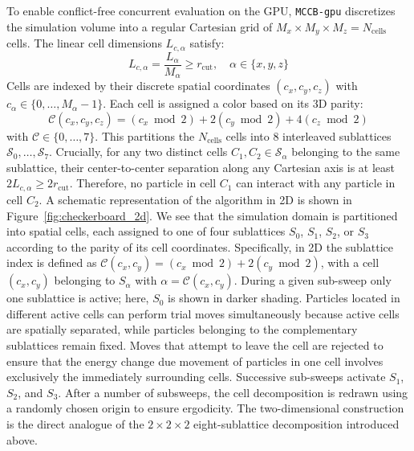 \documentclass[final,5p,times,twocolumn]{elsarticle}
\begin{document}
To enable conflict-free concurrent evaluation on the GPU, \texttt{MCCB-gpu} discretizes the simulation volume into a regular Cartesian grid of $M_x \times M_y \times M_z = N_{\text{cells}}$ cells. The linear cell dimensions $L_{c,\alpha}$ satisfy:
\begin{equation}
    L_{c,\alpha} = \frac{L_\alpha}{M_\alpha} \ge r_{\text{cut}}, \quad \alpha \in \{x, y, z\}
    \label{eq:cell_condition}
\end{equation}
Cells are indexed by their discrete spatial coordinates $(c_x, c_y, c_z)$ with $c_\alpha \in \{0, \dots, M_\alpha - 1\}$. Each cell is assigned a color based on its 3D parity:
\begin{equation}
    \mathcal{C}(c_x, c_y, c_z) = (c_x \bmod 2) + 2(c_y \bmod 2) + 4(c_z \bmod 2)
    \label{eq:parity}
\end{equation}
with $\mathcal{C} \in \{0, \dots, 7\}$. This partitions the
$N_{\text{cells}}$ cells into 8 interleaved sublattices
$\mathcal{S}_0, \dots, \mathcal{S}_7$. Crucially, for any two distinct
cells $C_1, C_2 \in \mathcal{S}_\alpha$ belonging to the same sublattice,
their center-to-center separation along any Cartesian axis is at least
$2 L_{c,\alpha} \ge 2 r_{\text{cut}}$. Therefore, no particle in cell
$C_1$ can interact with any particle in cell $C_2$. A schematic
representation of the algorithm in 2D is shown in Figure~\ref{fig:checkerboard_2d}.
We see that the simulation domain is partitioned into spatial cells, each assigned 
to one of four sublattices $S_0$, $S_1$, $S_2$, or $S_3$ according to
the parity of its cell coordinates. Specifically, in 2D the sublattice
index is defined as
$\mathcal{C}(c_x, c_y) = (c_x \bmod 2) + 2(c_y \bmod 2)$, with a cell
$(c_x, c_y)$ belonging to $S_\alpha$ with $\alpha = \mathcal{C}(c_x, c_y)$.
During a given sub-sweep only one sublattice is active; here,
$S_0$ is shown in darker shading.
Particles located in different active cells can perform trial moves
simultaneously because active cells are spatially separated, while
particles belonging to the complementary sublattices remain fixed.
Moves that attempt to leave the cell are rejected to ensure that the
energy change due movement of particles in one cell involves
exclusively the immediately surrounding cells. 
Successive sub-sweeps activate $S_1$, $S_2$, and $S_3$.  After a
number of subsweeps, the cell decomposition is redrawn using a
randomly chosen origin to ensure ergodicity.   
The two-dimensional construction is the direct analogue of the
$2\times2\times2$ eight-sublattice decomposition introduced above. 
\end{document}
